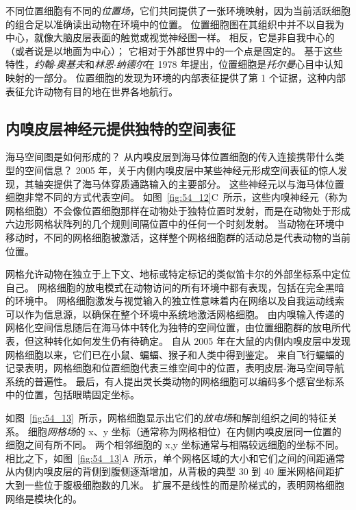 不同位置细胞有不同的\textit{位置场}，它们共同提供了一张环境映射，因为当前活跃细胞的组合足以准确读出动物在环境中的位置。
位置细胞图在其组织中并不以自我为中心，就像大脑皮层表面的触觉或视觉神经图一样。
相反，它是非自我中心的（或者说是以地面为中心）；
它相对于外部世界中的一个点是固定的。
基于这些特性，\textit{约翰$\cdot$奥基夫}和\textit{林恩$\cdot$纳德尔}在 1978 年提出，位置细胞是\textit{托尔曼}心目中认知映射的一部分。
位置细胞的发现为环境的内部表征提供了第 1 个证据，这种内部表征允许动物有目的地在世界各地航行。



\subsection{内嗅皮层神经元提供独特的空间表征}

海马空间图是如何形成的？
从内嗅皮层到海马体位置细胞的传入连接携带什么类型的空间信息？
2005 年，关于内侧内嗅皮层中某些神经元形成空间表征的惊人发现，其轴突提供了海马体穿质通路输入的主要部分。
这些神经元以与海马体位置细胞非常不同的方式代表空间。
如图~\ref{fig:54_12}C~所示，这些内嗅神经元（称为网格细胞）不会像位置细胞那样在动物处于独特位置时发射，而是在动物处于形成六边形网格状阵列的几个规则间隔位置中的任何一个时刻发射。
当动物在环境中移动时，不同的网格细胞被激活，这样整个网格细胞群的活动总是代表动物的当前位置。


网格允许动物在独立于上下文、地标或特定标记的类似笛卡尔的外部坐标系中定位自己。
网格细胞的放电模式在动物访问的所有环境中都有表现，包括在完全黑暗的环境中。
网格细胞激发与视觉输入的独立性意味着内在网络以及自我运动线索可以作为信息源，以确保在整个环境中系统地激活网格细胞。
由内嗅输入传递的网格化空间信息随后在海马体中转化为独特的空间位置，由位置细胞群的放电所代表，但这种转化如何发生仍有待确定。
自从 2005 年在大鼠的内侧内嗅皮层中发现网格细胞以来，它们已在小鼠、蝙蝠、猴子和人类中得到鉴定。
来自飞行蝙蝠的记录表明，网格细胞和位置细胞代表三维空间中的位置，表明皮层-海马空间导航系统的普遍性。
最后，有人提出灵长类动物的网格细胞可以编码多个感官坐标系中的位置，包括眼睛固定坐标。


如图~\ref{fig:54_13}~所示，网格细胞显示出它们的\textit{放电场}和解剖组织之间的特征关系。
细胞\textit{网格场}的 x、y 坐标（通常称为网格相位）在内侧内嗅皮层同一位置的细胞之间有所不同。
两个相邻细胞的 x,y 坐标通常与相隔较远细胞的坐标不同。
相比之下，如图~\ref{fig:54_13}A~所示，单个网格区域的大小和它们之间的间距通常从内侧内嗅皮层的背侧到腹侧逐渐增加，从背极的典型 30 到 40 厘米网格间距扩大到一些位于腹极细胞数的几米。
扩展不是线性的而是阶梯式的，表明网格细胞网络是模块化的。


